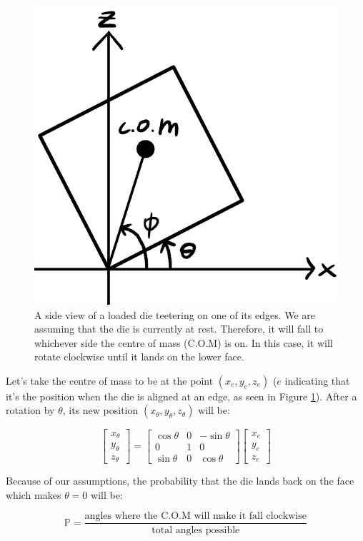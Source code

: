\documentclass[english,12pt,a4paper,final]{article}
\begin{document}
\begin{figure}[H]
	\centering
	\includegraphics[width=0.5\linewidth]{loadedDie}
	\caption[A loaded die teetering on one of its edges]{A side view of a loaded die teetering on one of its edges. We are assuming that the die is currently at rest. Therefore, it will fall to whichever side the centre of mass (C.O.M) is on. In this case, it will rotate clockwise until it lands on the lower face.}
	\label{fig:loadeddie}
\end{figure}

Let's take the centre of mass to be at the point $(x_e, y_e, z_e)$ ($e$ indicating that it's the position when the die is aligned at an edge, as seen in Figure \ref{fig:loadeddie}). After a rotation by $\theta$, its new position $(x_{\theta}, y_{\theta}, z_{\theta})$ will be:

\begin{equation*}
	\begin{bmatrix} x_{\theta} \\ y_{\theta} \\ z_{\theta} \end{bmatrix} = \begin{bmatrix} \cos\theta & 0 & -\sin\theta \\ 0 & 1 & 0 \\ \sin\theta & 0 & \cos\theta \end{bmatrix} \begin{bmatrix} x_e \\ y_e \\ z_e \end{bmatrix}
\end{equation*}


Because of our assumptions, the probability that the die lands back on the face which makes $\theta = 0$ will be:

\begin{equation*}
	\mathbb{P} = \frac{\text{angles where the C.O.M will make it fall clockwise}}{\text{total angles possible}}
\end{equation*}
\end{document}
